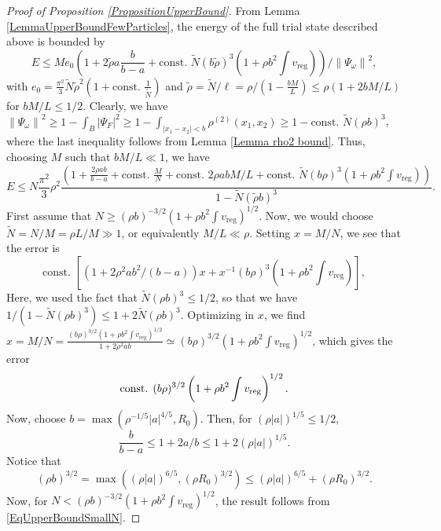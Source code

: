 \documentclass[a4paper,11pt]{article}
\newcommand{\norm}[1]{\left\lVert #1 \right\rVert}
\newcommand{\abs}[1]{\left\lvert #1 \right\rvert}
\numberwithin{equation}{section}
\begin{document}
	\begin{proof}[Proof of Proposition \ref{PropositionUpperBound}]
	From Lemma \ref{LemmaUpperBoundFewParticles}, the energy of the full trial state described above is bounded by \begin{equation}\label{EqUpperBoundSmallN}
	E\leq M e_0\left(1+2\tilde{\rho} a\frac{b}{b-a} + \text{const. } \tilde{N} (b\tilde{\rho})^3\left(1+\rho b^2\int v_{\text{reg}}\right)\right)/\norm{\Psi_\omega}^2,
	\end{equation}
	with $ e_0=\frac{\pi^2}{3}\tilde{N}\tilde{\rho}^2(1+\text{const. }\frac{1}{\tilde{N}}) $ and $ \tilde{\rho}=\tilde{N}/\ell=\rho/(1-\frac{bM}{L})\leq \rho(1+2bM/L) $ for $ bM/L\leq 1/2 $. Clearly, we have $ \norm{\Psi_\omega}^2\geq 1-\int_B\abs{\Psi_F}^2\geq 1-\int_{\abs{x_1-x_2}<b}\rho^{(2)}(x_1,x_2)\geq 1-\text{const. }\tilde{N}(\rho b)^3 $, where the last inequality follows from Lemma \ref{Lemma rho2 bound}.
	Thus, choosing $ M $ such that $ bM/L\ll 1 $, we have \begin{equation}
	E\leq N\frac{\pi^2}{3}\rho^2\frac{\left(1+\frac{2\rho ab}{b-a}+\text{const. }\frac{M}{N}+\text{const. }2\rho abM/L+\text{const. }\tilde{N}(b\rho)^3\left(1+\rho b^2\int v_{\text{reg}}\right)\right)}{1-\tilde{N}(\tilde{\rho} b)^3}.
	\end{equation}
	First assume that $ N\geq (\rho b)^{-3/2}\left(1+\rho b^2\int v_{\text{reg}}\right)^{1/2} $. Now, we would choose $ \tilde{N}=N/M=\rho L/M\gg 1 $, or equivalently $ M/L\ll \rho $. Setting $ x=M/N $, we see that the error is \begin{equation}
	\text{const. }\left[(1+2\rho^2 ab^2/(b-a))x+x^{-1}(b\rho)^3\left(1+\rho b^2\int v_{\text{reg}}\right)\right],
	\end{equation}
	Here, we used the fact that $ \tilde{N}(\rho b)^3\leq 1/2 $, so that we have\\ $ 1/(1-\tilde{N}(\rho b)^3)\leq 1+2\tilde{N}(\rho b)^3 $.
	Optimizing in $ x $, we find $ x=M/N=\frac{(b\rho)^{3/2}\left(1+\rho b^2\int v_{\text{reg}}\right)^{1/2}}{1+2\rho^2 a b}\simeq(b\rho)^{3/2}\left(1+\rho b^2\int v_{\text{reg}}\right)^{1/2} $, which gives the error \begin{equation}
	\text{const. }(b\rho)^{3/2}\left(1+\rho b^2 \int v_{\textnormal{reg}}\right)^{1/2}.
	\end{equation}
	Now, choose $ b=\max(\rho^{-1/5}\abs{a}^{4/5},R_0) $. Then, for $(\rho \abs{a})^{1/5}\leq 1/2$, 
	\begin{equation}
	\frac{b}{b-a}\leq1+2a/b\leq  1+2(\rho\abs{a})^{1/5}.
	\end{equation}
	Notice that
	\begin{equation}(\rho b)^{3/2}= \max\left((\rho \abs{a})^{6/5},(\rho R_0)^{3/2}\right)\leq  (\rho \abs{a})^{6/5}+(\rho R_0)^{3/2}. 
	\end{equation}
	Now, for $ N<(\rho b)^{-3/2}\left(1+\rho b^2\int v_{\text{reg}}\right)^{1/2} $, the result follows from \eqref{EqUpperBoundSmallN}.
\end{proof}
\end{document}
